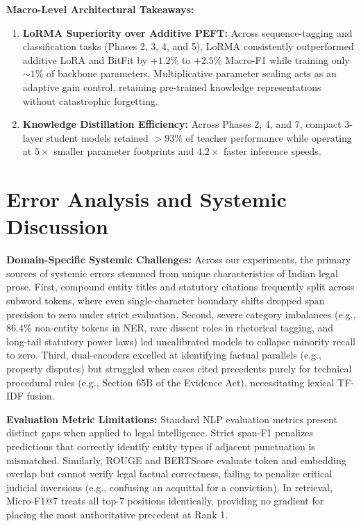 \documentclass[11pt, oneside]{article}
\begin{document}
\noindent
\textbf{Macro-Level Architectural Takeaways:}
\begin{enumerate}[leftmargin=*,noitemsep]
    \item \textbf{LoRMA Superiority over Additive PEFT:} Across sequence-tagging and classification tasks (Phases 2, 3, 4, and 5), LoRMA consistently outperformed additive LoRA and BitFit by $+1.2\%$ to $+2.5\%$ Macro-F1 while training only $\sim1\%$ of backbone parameters. Multiplicative parameter scaling acts as an adaptive gain control, retaining pre-trained knowledge representations without catastrophic forgetting.
    \item \textbf{Knowledge Distillation Efficiency:} Across Phases 2, 4, and 7, compact 3-layer student models retained $>93\%$ of teacher performance while operating at $5\times$ smaller parameter footprints and $4.2\times$ faster inference speeds.
\end{enumerate}

\section{Error Analysis and Systemic Discussion}
\noindent
\textbf{Domain-Specific Systemic Challenges:} Across our experiments, the primary sources of systemic errors stemmed from unique characteristics of Indian legal prose. First, compound entity titles and statutory citations frequently split across subword tokens, where even single-character boundary shifts dropped span precision to zero under strict evaluation. Second, severe category imbalances (e.g., $86.4\%$ non-entity tokens in NER, rare dissent roles in rhetorical tagging, and long-tail statutory power laws) led uncalibrated models to collapse minority recall to zero. Third, dual-encoders excelled at identifying factual parallels (e.g., property disputes) but struggled when cases cited precedents purely for technical procedural rules (e.g., Section 65B of the Evidence Act), necessitating lexical TF-IDF fusion.

\medskip
\noindent
\textbf{Evaluation Metric Limitations:} Standard NLP evaluation metrics present distinct gaps when applied to legal intelligence. Strict span-F1 penalizes predictions that correctly identify entity types if adjacent punctuation is mismatched. Similarly, ROUGE and BERTScore evaluate token and embedding overlap but cannot verify legal factual correctness, failing to penalize critical judicial inversions (e.g., confusing an acquittal for a conviction). In retrieval, Micro-F1@7 treats all top-7 positions identically, providing no gradient for placing the most authoritative precedent at Rank 1.
\end{document}
